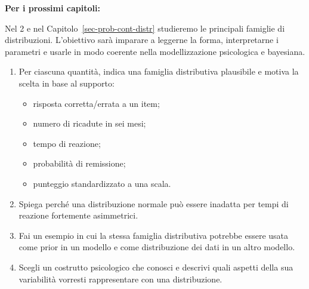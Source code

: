 \documentclass[
  italian,
  letterpaper,
  a4paper,
  11pt,
  open=any]{scrbook}
\providecommand{\tightlist}{%
  \setlength{\itemsep}{0pt}\setlength{\parskip}{0pt}}
\theoremstyle{plain}
\theoremstyle{definition}
\theoremstyle{definition}
\theoremstyle{remark}
\begin{document}
\begin{tcolorbox}
\textbf{Per i prossimi capitoli:}

Nel 2 e nel Capitolo~\ref{sec-prob-cont-distr} studieremo le principali
famiglie di distribuzioni. L'obiettivo sarà imparare a leggerne la
forma, interpretarne i parametri e usarle in modo coerente nella
modellizzazione psicologica e bayesiana.

\end{tcolorbox}

\begin{tcolorbox}[enhanced jigsaw, arc=.35mm, bottomrule=.15mm, bottomtitle=1mm, breakable, colback=white, colbacktitle=quarto-callout-note-color!10!white, colframe=quarto-callout-note-color-frame, coltitle=black, left=2mm, leftrule=.75mm, opacityback=0, opacitybacktitle=0.6, rightrule=.15mm, title=\textcolor{quarto-callout-note-color}{\faInfo}\hspace{0.5em}{Esercizi di autovalutazione}, titlerule=0mm, toprule=.15mm, toptitle=1mm]

\begin{enumerate}
\def\labelenumi{\arabic{enumi}.}
\item
  Per ciascuna quantità, indica una famiglia distributiva plausibile e
  motiva la scelta in base al supporto:

  \begin{itemize}
  \tightlist
  \item
    risposta corretta/errata a un item;
  \item
    numero di ricadute in sei mesi;
  \item
    tempo di reazione;
  \item
    probabilità di remissione;
  \item
    punteggio standardizzato a una scala.
  \end{itemize}
\item
  Spiega perché una distribuzione normale può essere inadatta per tempi
  di reazione fortemente asimmetrici.
\item
  Fai un esempio in cui la stessa famiglia distributiva potrebbe essere
  usata come prior in un modello e come distribuzione dei dati in un
  altro modello.
\item
  Scegli un costrutto psicologico che conosci e descrivi quali aspetti
  della sua variabilità vorresti rappresentare con una distribuzione.
\end{enumerate}

\end{tcolorbox}
\end{document}
